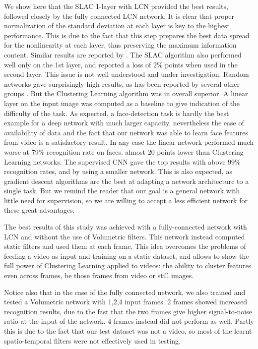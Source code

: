 \documentclass{article} %
\begin{document}
We show here that the SLAC 1-layer with LCN provided the best results, followed closely by the fully connected LCN network. It is clear that proper normalization of the standard deviation at each layer is key to the highest performance. This is due to the fact that this step prepares the best data spread for the nonlinearity at each layer, thus preserving the maximum information content. Similar results are reported by \cite{coates2012emergence}. 
The SLAC algorithm also performed well only on the 1st layer, and reported a loss of 2\% points when used in the second layer. This issue is not well understood and under investigation. 
Random networks gave surprisingly high results, as has been reported by several other groups \cite{saxe2011random}. But the Clustering Learning algorithm was in overall superior. 
A linear layer on the input image was computed as a baseline to give indication of the difficulty of the task. As expected, a face-detection task is hardly the best example for a deep network with much larger capacity. nevertheless the ease of availability of data and the fact that our network was able to learn face features from video is a satisfactory result. In any case the linear network performed much worse at 79\% recognition rate on faces. almost 20 points lower than Clustering Learning networks.
The supervised CNN gave the top results with above 99\% recognition rates, and by using a smaller network. This is also expected, as gradient descent algorithms are the best at adapting a network architecture to a single task. But we remind the reader that our goal is a general network with little need for supervision, so we are willing to accept a less efficient network for these great advantages. 

The best results of this study was achieved with a fully-connected network with LCN and without the use of Volumetric filters. This network instead computed static filters and used them at each frame. This idea overcomes the problems of feeding a video as input and training on a static dataset, and allows to show the full power of Clustering Learning applied to videos: the ability to cluster features even across frames, be those frames from video or still images.

Notice also that in the case of the fully connected network, we also trained and tested a Volumetric network with 1,2,4 input frames. 
2 frames showed increased recognition results, due to the fast that the two frames give higher signal-to-noise ratio at the input of the network. 4 frames instead did not perform as well. Partly this is due to the fact that our test dataset was not a video, so most of the learnt spatio-temporal filters were not effectively used in testing.
\end{document}

